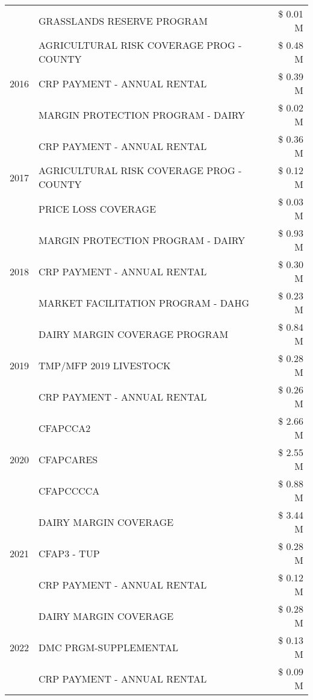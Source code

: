 \begin{tabular}{llr}
 & GRASSLANDS RESERVE PROGRAM & \$ 0.01 M \\
\cline{1-3}
\multirow[t]{3}{*}{2016} & AGRICULTURAL RISK COVERAGE PROG - COUNTY & \$ 0.48 M \\
 & CRP PAYMENT - ANNUAL RENTAL & \$ 0.39 M \\
 & MARGIN PROTECTION PROGRAM - DAIRY & \$ 0.02 M \\
\cline{1-3}
\multirow[t]{3}{*}{2017} & CRP PAYMENT - ANNUAL RENTAL & \$ 0.36 M \\
 & AGRICULTURAL RISK COVERAGE PROG - COUNTY & \$ 0.12 M \\
 & PRICE LOSS COVERAGE & \$ 0.03 M \\
\cline{1-3}
\multirow[t]{3}{*}{2018} & MARGIN PROTECTION PROGRAM - DAIRY & \$ 0.93 M \\
 & CRP PAYMENT - ANNUAL RENTAL & \$ 0.30 M \\
 & MARKET FACILITATION PROGRAM - DAHG & \$ 0.23 M \\
\cline{1-3}
\multirow[t]{3}{*}{2019} & DAIRY MARGIN COVERAGE PROGRAM & \$ 0.84 M \\
 & TMP/MFP 2019 LIVESTOCK & \$ 0.28 M \\
 & CRP PAYMENT - ANNUAL RENTAL & \$ 0.26 M \\
\cline{1-3}
\multirow[t]{3}{*}{2020} & CFAPCCA2 & \$ 2.66 M \\
 & CFAPCARES & \$ 2.55 M \\
 & CFAPCCCCA & \$ 0.88 M \\
\cline{1-3}
\multirow[t]{3}{*}{2021} & DAIRY MARGIN COVERAGE & \$ 3.44 M \\
 & CFAP3 - TUP & \$ 0.28 M \\
 & CRP PAYMENT - ANNUAL RENTAL & \$ 0.12 M \\
\cline{1-3}
\multirow[t]{3}{*}{2022} & DAIRY MARGIN COVERAGE & \$ 0.28 M \\
 & DMC PRGM-SUPPLEMENTAL & \$ 0.13 M \\
 & CRP PAYMENT - ANNUAL RENTAL & \$ 0.09 M \\
\cline{1-3}
\bottomrule
\end{tabular}
